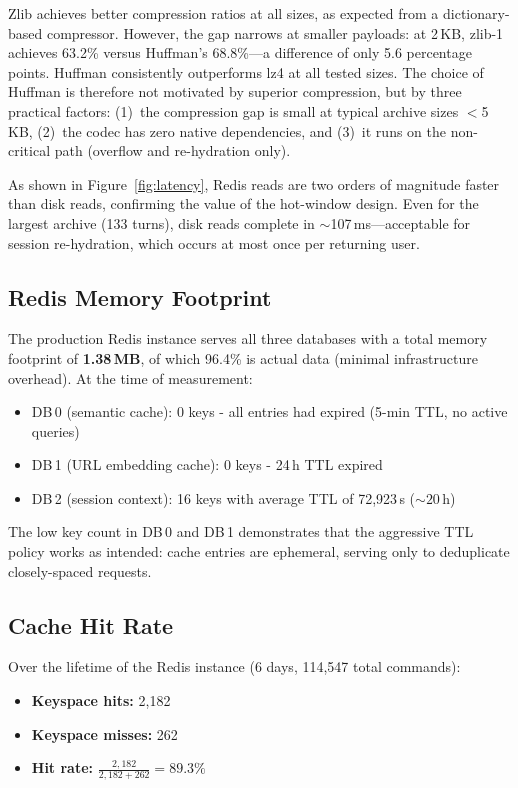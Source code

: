 \documentclass[conference]{IEEEtran}
\begin{document}
Zlib achieves better compression ratios at all sizes, as expected from a dictionary-based compressor. However, the gap narrows at smaller payloads: at 2\,KB, zlib-1 achieves 63.2\% versus Huffman's 68.8\%---a difference of only 5.6 percentage points. Huffman consistently outperforms lz4 at all tested sizes. The choice of Huffman is therefore not motivated by superior compression, but by three practical factors: (1)~the compression gap is small at typical archive sizes $<$5\,KB, (2)~the codec has zero native dependencies, and (3)~it runs on the non-critical path (overflow and re-hydration only).

As shown in Figure~\ref{fig:latency}, Redis reads are two orders of magnitude faster than disk reads, confirming the value of the hot-window design. Even for the largest archive (133 turns), disk reads complete in ${\sim}$107\,ms---acceptable for session re-hydration, which occurs at most once per returning user.

\subsection{Redis Memory Footprint}

The production Redis instance serves all three databases with a total memory footprint of \textbf{1.38\,MB}, of which 96.4\% is actual data (minimal infrastructure overhead). At the time of measurement:

\begin{itemize}
\item DB\,0 (semantic cache): 0 keys - all entries had expired (5-min TTL, no active queries)
\item DB\,1 (URL embedding cache): 0 keys - 24\,h TTL expired
\item DB\,2 (session context): 16 keys with average TTL of 72{,}923\,s (${\sim}20$\,h)
\end{itemize}

The low key count in DB\,0 and DB\,1 demonstrates that the aggressive TTL policy works as intended: cache entries are ephemeral, serving only to deduplicate closely-spaced requests.

\subsection{Cache Hit Rate}

Over the lifetime of the Redis instance (6 days, 114{,}547 total commands):

\begin{itemize}
\item \textbf{Keyspace hits:} 2{,}182
\item \textbf{Keyspace misses:} 262
\item \textbf{Hit rate:} $\frac{2{,}182}{2{,}182 + 262} = \mathbf{89.3\%}$
\end{itemize}
\end{document}
